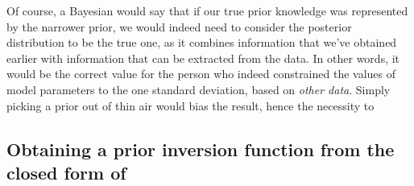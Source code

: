 \documentclass[usenatbib]{mnras}
\begin{document}
Of course, a Bayesian would say that if our true prior knowledge
was represented by the narrower prior, we would indeed need to
consider the posterior distribution to be the true one, as it
combines information that we've obtained earlier with information
that can be extracted from the data. In other words, it would be
the correct value for the person who indeed constrained the values
of model parameters to the one standard deviation, based on \emph{other
data}. Simply picking a prior out of thin air would bias the result, hence the necessity to 



\subsection{Obtaining a prior inversion function from the closed form of}
\label{sec:orgb42ced2}
\end{document}
